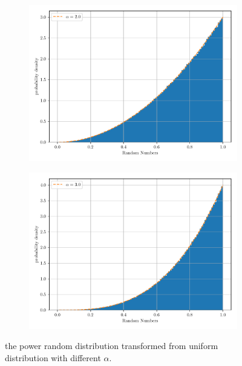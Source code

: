 \documentclass[paper=a4, fontsize=11pt]{scrartcl} %
\numberwithin{equation}{section} %
\numberwithin{figure}{section} %
\numberwithin{table}{section} %
\begin{document}
\begin{figure}[!ht]
\begin{subfigure}[b]{0.495\textwidth}
		\includegraphics[width=\linewidth]{figure_3_g.pdf}
		\label{fig:non-uniform_1:g}
	\end{subfigure}
	\begin{subfigure}[b]{0.495\textwidth}
		\centering
		\includegraphics[width=\linewidth]{figure_3_h.pdf}
		\label{fig:non-uniform_1:h}
	\end{subfigure}
	\caption{the power random distribution transformed from uniform distribution with different \(\alpha\).}
	\label{fig:non-uniform_1}
\end{figure}\par

\end{document}
